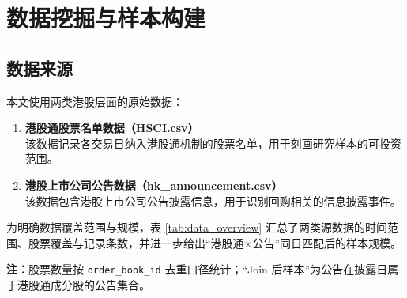 \documentclass[a4paper,10pt]{article}
\begin{document}
\section{数据挖掘与样本构建}

\subsection{数据来源}

本文使用两类港股层面的原始数据：

\begin{enumerate}
    \item \textbf{港股通股票名单数据（HSCI.csv）}\\
    该数据记录各交易日纳入港股通机制的股票名单，用于刻画研究样本的可投资范围。
    
    \item \textbf{港股上市公司公告数据（hk\_announcement.csv）}\\
    该数据包含港股上市公司公告披露信息，用于识别回购相关的信息披露事件。
\end{enumerate}

为明确数据覆盖范围与规模，表 \ref{tab:data_overview} 汇总了两类源数据的时间范围、股票覆盖与记录条数，并进一步给出“港股通$\times$公告”同日匹配后的样本规模。

\begin{table}[H]
    \centering
    \caption{数据集概览（Data Overview）}
    \label{tab:data_overview}
    \vspace{0.2cm} %
    \begin{flushleft}
        \footnotesize
        \textbf{注：}股票数量按 \texttt{order\_book\_id} 去重口径统计；“Join 后样本”为公告在披露日属于港股通成分股的公告集合。
    \end{flushleft}
\end{table}
\end{document}
